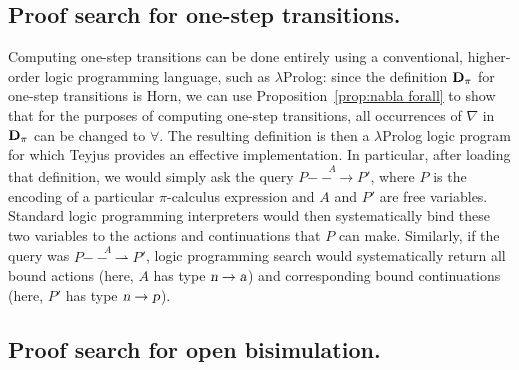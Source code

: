 \documentclass{acmtrans2m}
\newcommand{\action}{\hbox{\sl a}}
\newcommand{\name}{\hbox{\sl n}}
\newcommand{\one  }[3]{#1\stackrel{#2}{-\!\!-\!\!\!\rightarrow    } #3}
\newcommand{\onep }[3]{#1\stackrel{#2}{-\!\!-\!\!\!\rightharpoonup} #3}
\newcommand{\proc}{\hbox{\sl p}}
\begin{document}
\subsection{Proof search for one-step transitions.}
Computing one-step transitions can be done entirely using a
conventional, higher-order logic programming language, such as
$\lambda$Prolog: since the definition ${\bf D}_{\pi}$ for one-step
transitions is Horn, we can use Proposition~\ref{prop:nabla forall} to show
that for the purposes of computing one-step transitions, all
occurrences of $\nabla$ in ${\bf D}_{\pi}$ can be changed to
$\forall$.  The resulting definition is then a $\lambda$Prolog logic
program for which Teyjus provides an effective implementation.  In particular,
after loading that definition, we would simply ask the query
$\one{P}{A}{P'}$, where $P$ is the encoding of a particular
$\pi$-calculus expression and $A$ and $P'$ are free
variables.  Standard logic programming interpreters would then
systematically bind 
these two variables to the actions and continuations that $P$ can
make.  Similarly, if the query was $\onep{P}{A}{P'}$, logic
programming search would systematically return all bound actions
(here, $A$ has type $\name\to \action$) and corresponding bound
continuations (here, $P'$ has type $\name\to \proc$).

\subsection{Proof search for open bisimulation.}
\end{document}
